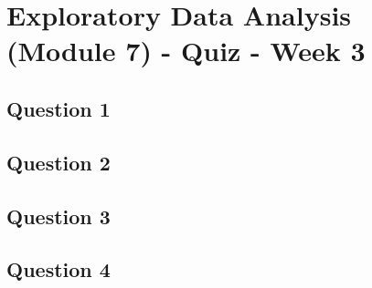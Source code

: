 \documentclass[french]{article}
\begin{document}
\section*{Exploratory Data Analysis (Module 7) - Quiz - Week 3}
\subsection*{Question 1}

\newpage
\subsection*{Question 2}


\newpage
\subsection*{Question 3}

\newpage
\subsection*{Question 4}
\end{document}
